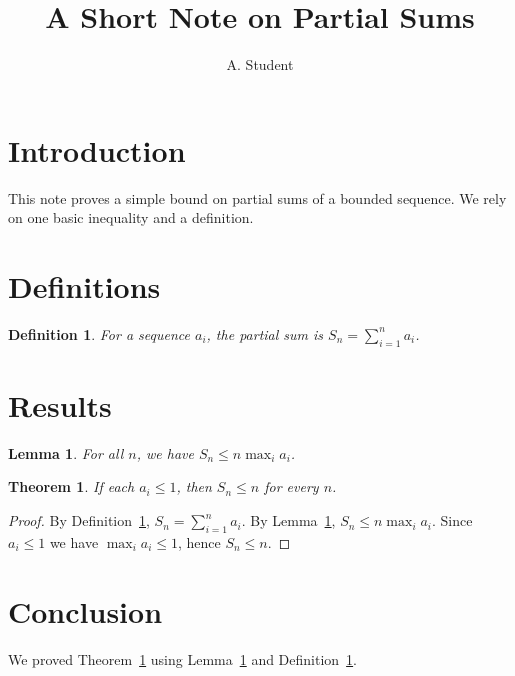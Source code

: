 \documentclass{article}
\title{A Short Note on Partial Sums}
\author{A. Student}
\newtheorem{theorem}{Theorem}
\newtheorem{lemma}{Lemma}
\newtheorem{definition}{Definition}
\begin{document}
\maketitle

\section{Introduction}
This note proves a simple bound on partial sums of a bounded sequence.
We rely on one basic inequality and a definition.

\section{Definitions}
\begin{definition}\label{def:sum}
For a sequence $a_i$, the partial sum is $S_n = \sum_{i=1}^{n} a_i$.
\end{definition}

\section{Results}
\begin{lemma}\label{lem:bound}
For all $n$, we have $S_n \le n \max_i a_i$.
\end{lemma}

\begin{theorem}\label{thm:main}
If each $a_i \le 1$, then $S_n \le n$ for every $n$.
\end{theorem}
\begin{proof}
By Definition~\ref{def:sum}, $S_n = \sum_{i=1}^{n} a_i$.
By Lemma~\ref{lem:bound}, $S_n \le n \max_i a_i$.
Since $a_i \le 1$ we have $\max_i a_i \le 1$, hence $S_n \le n$.
\end{proof}

\section{Conclusion}
We proved Theorem~\ref{thm:main} using Lemma~\ref{lem:bound} and Definition~\ref{def:sum}.
\end{document}
